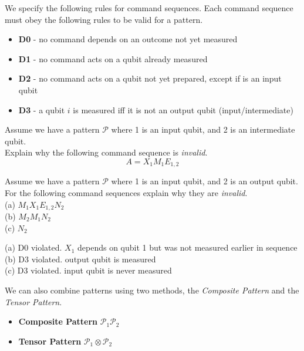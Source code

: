 We specify the following rules for command sequences. Each command sequence 
must obey the following rules to be valid for a pattern.
\begin{itemize}
\item \textbf{D0} - no command depends on an outcome not yet measured
\item \textbf{D1} - no command acts on a qubit already measured
\item \textbf{D2} - no command acts on a qubit not yet prepared, except if is an input qubit
\item \textbf{D3} - a qubit $i$ is measured iff it is not an output qubit (input/intermediate)
\end{itemize}

\frmrule

\begin{example}
Assume we have a pattern $\mathcal{P}$ where 1 is an input qubit, and 
2 is an intermediate qubit. \\
Explain why the following command sequence is \textit{invalid}. 
$$A = X_1 M_1 E_{1,2} $$



\end{example}

\frmrule

\begin{example}
Assume we have a pattern $\mathcal{P}$ where 1 is an input qubit, and 
2 is an output qubit. \\
For the following command sequences explain why they are \textit{invalid}.\\ 
(a) $M_1 X_1 E_{1,2} N_2$ \\
(b) $M_2 M_1 N_2$ \\
(c) $N_2$ \\
\end{example}

{
(a) D0 violated. $X_{1}$ depends on qubit 1 but was not measured earlier in sequence \\
(b) D3 violated. output qubit is measured\\
(c) D3 violated. input qubit is never measured
}

\frmrule

We can also combine patterns using two methods, the \textit{Composite Pattern} 
and the \textit{Tensor Pattern}.  
\begin{itemize}
\item \textbf{Composite Pattern} $\mathcal{P}_1 \mathcal{P}_2$
\item \textbf{Tensor Pattern} $\mathcal{P}_1 \otimes \mathcal{P}_2$
\end{itemize}


